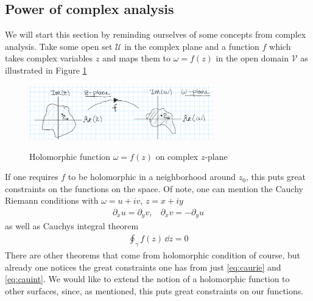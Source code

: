 \documentclass[lettersize,11pt]{article}
\begin{document}
\subsection{Power of complex analysis}
We will start this section by reminding ourselves of some concepts from complex analysis.
Take some open set $\mathcal{U}$ in the complex plane and a function $f$ which takes complex variables $z$ and maps them to $\omega=f(z)$ in the open domain $\mathcal{V}$ as illustrated in Figure \ref{fig:complan}
\begin{figure}[H] \centering
\includegraphics[width=8cm]{1.PNG} \label{fig:complan} \caption{Holomorphic function $\omega=f(z)$ on complex $z$-plane }
\end{figure}
If one requires $f$ to be holomorphic in a neighborhood around $z_0$, this puts great constraints on the functions on the space. Of note, one can mention the Cauchy Riemann conditions \cite{Goldbart} with $\omega=u+iv$, $z=x+iy$
\begin{equation} \label{eq:caurie}
	\begin{aligned}
		\partial_x u= \partial_y v,~~~~\partial_x v= -\partial_y u
	\end{aligned}
\end{equation}
as well as Cauchys integral theorem
\begin{equation}
	\begin{aligned} \label{eq:cauint}
		\oint_\gamma f(z)\,\dd z=0
	\end{aligned}
\end{equation}
There are other theorems that come from holomorphic condition of course, but already one notices the great constraints one has from just \eqref{eq:caurie} and \eqref{eq:cauint}. We would like to extend the notion of a holomorphic function to other surfaces, since, as mentioned, this puts great constraints on our functions.
\end{document}
